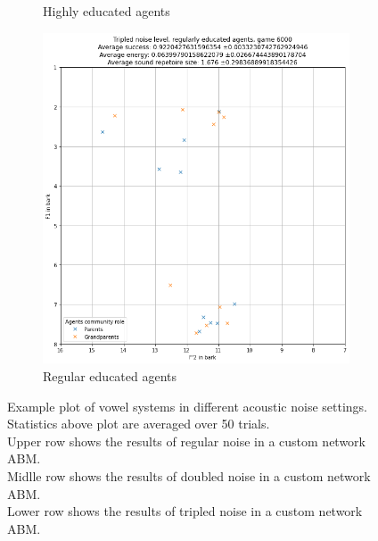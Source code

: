\begin{figure}[ht]
\begin{subfigure}{.30\textwidth}
        \captionsetup{width=0.9\linewidth}
        \captionsetup{justification=centering}
        \caption{Highly educated agents}
    \end{subfigure}
    \hspace{0.5cm}
    \begin{subfigure}{.30\textwidth}
        \centering
        \includegraphics[width=\textwidth]{images/results/triple_noise_regular.png}
        \captionsetup{width=0.9\linewidth}
        \captionsetup{justification=centering}
        \caption{Regular educated agents}
    \end{subfigure}
    \captionsetup{width=\linewidth}
    \captionsetup{justification=centering}
    \caption{Example plot of vowel systems in different acoustic noise settings.
    \\ Statistics above plot are averaged over 50 trials.
    \\Upper row shows the results of regular noise in a custom network ABM.
    \\Midlle row shows the results of doubled noise in a custom network ABM.
    \\Lower row shows the results of tripled noise in a custom network ABM.}
    \label{fig:noise_community}
\end{figure}